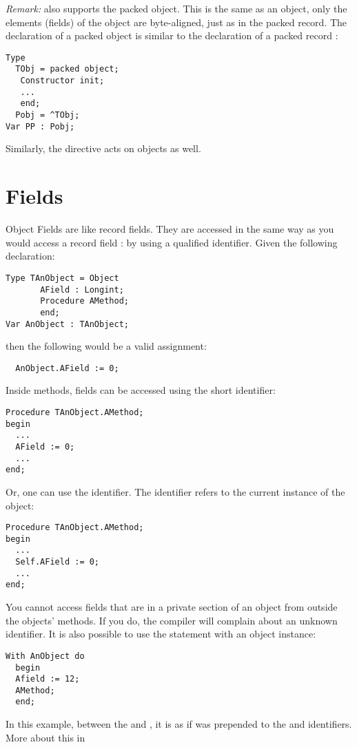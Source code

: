 \documentclass{report}
\begin{document}
{\em Remark:}
\fpc also supports the packed object. This is the same as an object, only
the elements (fields) of the object are byte-aligned, just as in the packed
record.
The declaration of a packed object is similar to the declaration
of a packed record :
\begin{verbatim}
Type
  TObj = packed object;
   Constructor init;
   ...
   end;
  Pobj = ^TObj;
Var PP : Pobj;
\end{verbatim}
Similarly, the  directive acts on objects as well.

\section{Fields}
Object Fields are like record fields. They are accessed in the same way as
you would access a record field : by using a qualified identifier. Given the
following declaration:
\begin{verbatim}
Type TAnObject = Object
       AField : Longint;
       Procedure AMethod;
       end;
Var AnObject : TAnObject;
\end{verbatim}
then the following would be a valid assignment:
\begin{verbatim}
  AnObject.AField := 0;
\end{verbatim}
Inside methods, fields can be accessed using the short identifier:
\begin{verbatim}
Procedure TAnObject.AMethod;
begin
  ...
  AField := 0;
  ...
end;
\end{verbatim}
Or, one can use the  identifier. The  identifier refers
to the current instance of the object:
\begin{verbatim}
Procedure TAnObject.AMethod;
begin
  ...
  Self.AField := 0;
  ...
end;
\end{verbatim}
You cannot access fields that are in a private section of an object from
outside the objects' methods. If you do, the compiler will complain about
an unknown identifier.
It is also possible to use the  statement with an object instance:
\begin{verbatim}
With AnObject do
  begin
  Afield := 12;
  AMethod;
  end;
\end{verbatim}
In this example, between the  and , it is as if
 was prepended to the  and 
identifiers. More about this in 
\end{document}
